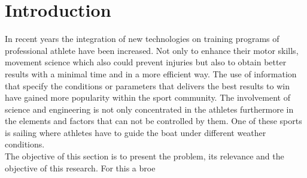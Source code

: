 \section{Introduction}
In recent years the integration of new technologies on training programs of professional athlete have been increased. Not only to enhance their motor skills, movement science which also could prevent injuries but also to obtain better results with a minimal time and in a more efficient way. The use of information that specify the conditions or parameters that delivers the best results to win have gained more popularity within the sport community. The involvement of science and engineering is not only concentrated in the athletes furthermore in the elements and factors that can not be controlled by them. One of these sports is sailing where athletes have to guide the boat under different weather conditions. \\
The objective of this section is to present the problem, its relevance and the objective of this research. For this a broe 





